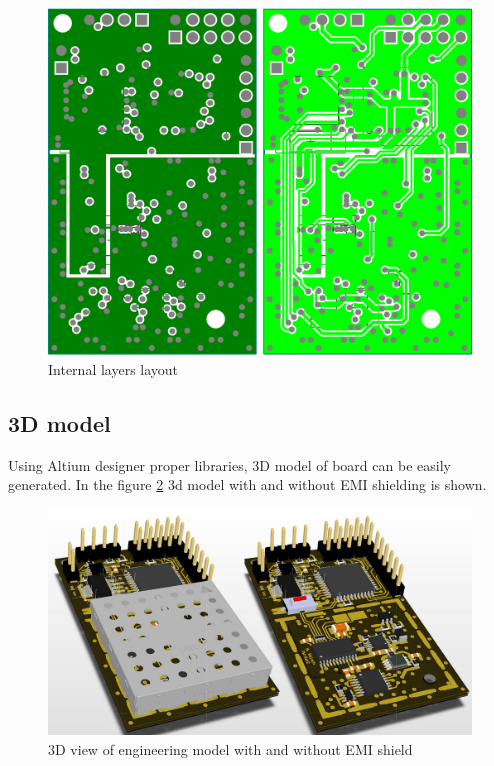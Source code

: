         \begin{figure}[H]
            \centering
            \includegraphics[width=0.6\paperwidth]{img/06/internal_layers_layout.eps}
            \caption{Internal layers layout}
            \label{internal_layers_layout}
        \end{figure}

    \subsection{3D model}
        Using Altium designer proper libraries, 3D model of board can be easily generated. In the figure \ref{pcb_3d_model} 3d model with and without EMI shielding is shown.

        \begin{figure}[H]
            \centering
            \includegraphics[width=0.8\paperwidth]{img/06/pcb_3d_model.png}
            \caption{3D view of engineering model with and without EMI shield}
            \label{pcb_3d_model}
        \end{figure}

